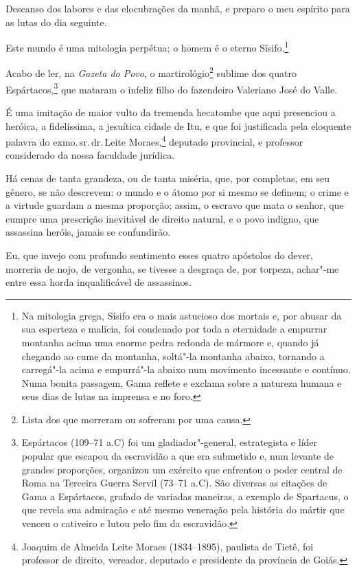 Descanso dos labores e das elocubrações da manhã, e preparo o meu
espírito para as lutas do dia seguinte.

Este mundo é uma mitologia perpétua; o homem é o eterno Sísifo.\footnote{
  Na mitologia grega, Sísifo era o mais astucioso dos mortais e, por
  abusar da sua esperteza e malícia, foi condenado por toda a eternidade
  a empurrar montanha acima uma enorme pedra redonda de mármore e,
  quando já chegando ao cume da montanha, soltá"-la montanha abaixo,
  tornando a carregá"-la acima e empurrá"-la abaixo num movimento
  incessante e contínuo. Numa bonita passagem, Gama reflete e exclama
  sobre a natureza humana e seus dias de lutas na imprensa e no foro.}

Acabo de ler, na \emph{Gazeta do Povo}, o martirológio\footnote{Lista
  dos que morreram ou sofreram por uma causa.} sublime dos quatro
Espártacos,\footnote{Espártacos (109--71 a.C) foi um \label{espartacos}
  gladiador"-general, estrategista e líder popular que escapou da
  escravidão a que era submetido e, num levante de grandes proporções,
  organizou um exército que enfrentou o poder central de Roma na
  Terceira Guerra Servil (73--71 a.C). São diversas as citações de
  Gama a Espártacos, grafado de variadas maneiras, a exemplo de
  Spartacus, o que revela sua admiração e até mesmo veneração pela
  história do mártir que venceu o cativeiro e lutou pelo fim da
  escravidão.} que mataram o infeliz filho do fazendeiro Valeriano José
do Valle.

É uma imitação de maior vulto da tremenda hecatombe que aqui presenciou
a heróica, a fidelíssima, a jesuítica cidade de Itu, e que foi
justificada pela eloquente palavra do exmo.\,sr.\,dr.\,Leite
Moraes,\footnote{Joaquim de Almeida Leite Moraes (1834--1895), paulista
  de Tietê, foi professor de direito, vereador, deputado e presidente da
  província de Goiás.} deputado provincial, e professor considerado da
nossa faculdade jurídica.

Há cenas de tanta grandeza, ou de tanta miséria, que, por completas, em
seu gênero, se não descrevem: o mundo e o átomo por si mesmo se definem;
o crime e a virtude guardam a mesma proporção; assim, o escravo que mata
o senhor, que cumpre uma prescrição inevitável de direito natural, e o
povo indigno, que assassina heróis, jamais se confundirão.

Eu, que invejo com profundo sentimento esses quatro apóstolos do dever,
morreria de nojo, de vergonha, se tivesse a desgraça de, por torpeza,
achar"-me entre essa horda inqualificável de assassinos.

